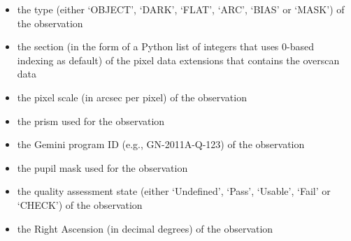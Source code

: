 \documentclass[letterpaper,10pt,english]{sphinxmanual}
\begin{document}
\begin{itemize}
\item {} 
the type (either `OBJECT', `DARK', `FLAT', `ARC', `BIAS' or `MASK') of the
observation

\end{itemize}

\begin{itemize}
\item {} 
the section (in the form of a Python list of integers that uses 0-based
indexing as default) of the pixel data extensions that contains the overscan
data

\end{itemize}

\begin{itemize}
\item {} 
the pixel scale (in arcsec per pixel) of the observation

\end{itemize}

\begin{itemize}
\item {} 
the prism used for the observation

\end{itemize}

\begin{itemize}
\item {} 
the Gemini program ID (e.g., GN-2011A-Q-123) of the observation

\end{itemize}

\begin{itemize}
\item {} 
the pupil mask used for the observation

\end{itemize}

\begin{itemize}
\item {} 
the quality assessment state (either `Undefined', `Pass', `Usable', `Fail' or
`CHECK') of the observation

\end{itemize}

\begin{itemize}
\item {} 
the Right Ascension (in decimal degrees) of the observation

\end{itemize}
\end{document}
